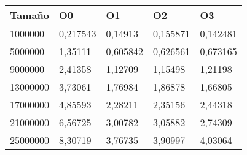 \begin{tabular}{|l|l|l|l|l|}
	\hline
	Tamaño & O0 & O1 & O2 & O3 \\
	\hline
	\hline
	1000000 & 0,217543 & 0,14913 & 0,155871 & 0,142481 \\
	\hline
	5000000 & 1,35111 & 0,605842 & 0,626561 & 0,673165 \\
	\hline
	9000000 & 2,41358 & 1,12709 & 1,15498 & 1,21198 \\
	\hline
	13000000 & 3,73061 & 1,76984 & 1,86878 & 1,66805 \\
	\hline
	17000000 & 4,85593 & 2,28211 & 2,35156 & 2,44318 \\
	\hline
	21000000 & 6,56725 & 3,00782 & 3,05882 & 2,74309 \\
	\hline
	25000000 & 8,30719 & 3,76735 & 3,90997 & 4,03064 \\
	\hline
\end{tabular}
